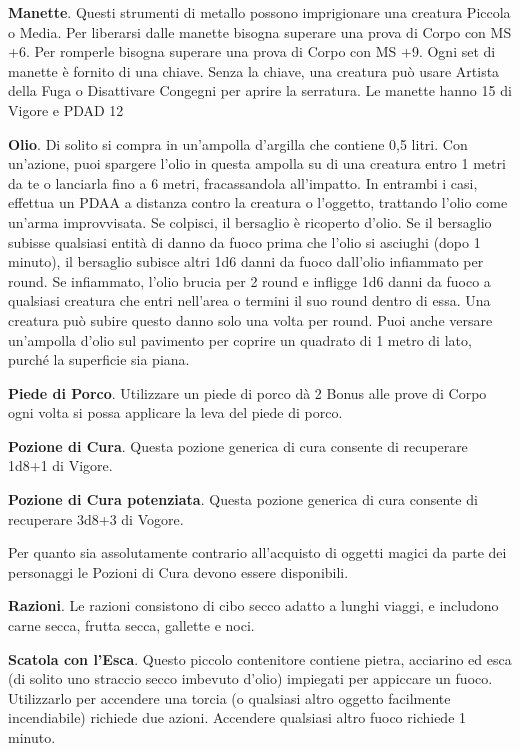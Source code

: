 \documentclass[12pt,a4paper,twoside,openany]{book}
\begin{document}
\begin{multicols}{2}
\textbf{Manette}. Questi strumenti di metallo possono imprigionare una creatura Piccola o Media. Per liberarsi dalle manette bisogna superare una prova di Corpo con MS +6. Per romperle bisogna superare una prova di Corpo con MS +9. Ogni set di manette è fornito di una chiave. Senza la chiave, una creatura può usare Artista della Fuga o Disattivare Congegni per aprire la serratura. Le manette hanno 15 di Vigore e PDAD 12

\textbf{Olio}. Di solito si compra in un’ampolla d’argilla che contiene 0,5 litri. Con un’azione, puoi spargere l’olio in questa ampolla su di una creatura entro 1 metri da te o lanciarla fino a 6 metri, fracassandola all’impatto. In entrambi i casi, effettua un PDAA a distanza contro la creatura o l’oggetto, trattando l’olio come un’arma improvvisata. Se colpisci, il bersaglio è ricoperto d’olio. Se il bersaglio subisse qualsiasi entità di danno da fuoco prima che l’olio si asciughi (dopo 1 minuto), il bersaglio subisce altri 1d6 danni da fuoco dall’olio infiammato per round. Se infiammato, l’olio brucia per 2 round e infligge 1d6 danni da fuoco a qualsiasi creatura che entri nell’area o termini il suo round dentro di essa. Una creatura può subire questo danno solo una volta per round. Puoi anche versare un’ampolla d’olio sul pavimento per coprire un quadrato di 1 metro di lato, purché la superficie sia piana.

\textbf{Piede di Porco}. Utilizzare un piede di porco dà 2 Bonus alle prove di Corpo ogni volta si possa applicare la leva del piede di porco.

\textbf{Pozione di Cura}. Questa pozione generica di cura consente di recuperare 1d8+1 di Vigore.

\textbf{Pozione di Cura potenziata}. Questa pozione generica di cura consente di recuperare 3d8+3 di Vogore.

\begin{changemargin}{0.3cm}{0.3cm}\begin{narratore} Per quanto sia assolutamente contrario all'acquisto di oggetti magici da parte dei personaggi le Pozioni di Cura devono essere disponibili.
\end{narratore}\end{changemargin}

\textbf{Razioni}. Le razioni consistono di cibo secco adatto a lunghi viaggi, e includono carne secca, frutta secca, gallette e noci.

\textbf{Scatola con l’Esca}. Questo piccolo contenitore contiene pietra, acciarino ed esca (di solito uno straccio secco imbevuto d’olio) impiegati per appiccare un fuoco. Utilizzarlo per accendere una torcia (o qualsiasi altro oggetto facilmente incendiabile) richiede due azioni. Accendere qualsiasi altro fuoco richiede 1 minuto.


\end{multicols}
\end{document}
